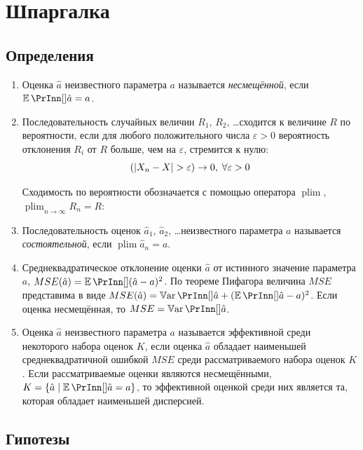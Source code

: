 \documentclass[12pt, a4paper]{article}
\DeclareMathOperator*{\plim}{plim}
\let\P\relax
\begin{document}
\section{Шпаргалка}

\subsection{Определения}


\begin{enumerate}

  \item Оценка $\hat a$ неизвестного параметра $a$ называется \textit{несмещённой}, если $\E(\hat a) = a$.

  \item Последовательность случайных величин $R_1$, $R_2$, \ldots сходится к величине $R$ по вероятности, если
  для любого положительного числа $\varepsilon >0$ вероятность отклонения $R_i$ от $R$ больше, чем на $\varepsilon$, 
  стремится к нулю:
  \[
  \P(|X_n - X| > \varepsilon ) \to 0, \; \forall \varepsilon > 0
  \]

Сходимость по вероятности обозначается с помощью оператора $\plim$, $\plim_{n\to\infty} R_n = R$:


  \item Последовательность оценок $\hat a_1$, $\hat a_2$, \ldots неизвестного параметра $a$ называется \textit{состоятельной}, если $\plim \hat a_n = a$.

 
\item Среднеквадратическое отклонение оценки $\hat a$ от истинного значение параметра $a$, $MSE(\hat a)=\E((\hat a - a)^2)$. По теореме Пифагора величина $MSE$ представима в виде $MSE(\hat a) = \Var(\hat a) + (\E(\hat a) - a)^2$. Если оценка несмещённая, то $MSE = \Var(\hat a)$.

\item Оценка $\hat a$ неизвестного параметра $a$ называется эффективной среди некоторого набора оценок $K$, 
если оценка $\hat a$ обладает наименьшей среднеквадратичной ошибкой $MSE$ среди рассматриваемого набора оценок $K$. 
Если рассматриваемые оценки являются несмещёнными, $K = \{\hat a \mid \E(\hat a) = a\}$, 
то эффективной оценкой среди них является та, которая обладает наименьшей дисперсией.

\end{enumerate}


\subsection{Гипотезы}
\end{document}
